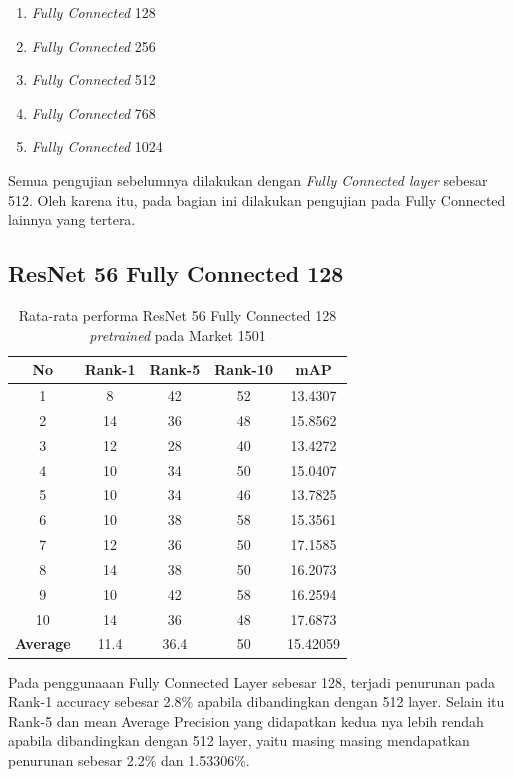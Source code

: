 \begin{enumerate}[nolistsep]
	\item \textit{Fully Connected} 128
	\item \textit{Fully Connected} 256
	\item \textit{Fully Connected} 512
	\item \textit{Fully Connected} 768
	\item \textit{Fully Connected} 1024
	\vspace{1ex}
\end{enumerate}

Semua pengujian sebelumnya dilakukan dengan \textit{Fully Connected layer} sebesar 512. Oleh karena itu, pada bagian ini dilakukan pengujian pada Fully Connected lainnya yang tertera.

\pagebreak

\subsection{ResNet 56 Fully Connected 128}
\vspace{1ex}
\begin{longtable}{|c|c|c|c|c|}
	\caption{Rata-rata performa ResNet 56 Fully Connected 128 \textit{pretrained} pada Market 1501}
	\label{tabel: 10}\\
	\hline
	\rowcolor[HTML]{C0C0C0}
	\textbf{No} &\textbf{Rank-1} & \textbf{Rank-5} & \textbf{Rank-10} & \textbf{mAP} \\
	\hline
	1 &8 &42 &52 &13.4307 \\
	2 &14 &36 &48 &15.8562 \\
	3 &12 &28 &40 &13.4272 \\
	4 &10 &34 &50 &15.0407 \\
	5 &10 &34 &46 &13.7825 \\
	6 &10 &38 &58 &15.3561 \\
	7 &12 &36 &50 &17.1585 \\
	8 &14 &38 &50 &16.2073 \\
	9 &10 &42 &58 &16.2594 \\
	10 &14 &36 &48 &17.6873 \\
	\hline
	\textbf{Average} & 11.4 & 36.4 & 50 &15.42059 \\
	\hline
\end{longtable}
\vspace{2ex}
	Pada penggunaaan Fully Connected Layer sebesar 128, terjadi penurunan pada Rank-1 accuracy sebesar 2.8\% apabila dibandingkan dengan 512 layer. Selain itu Rank-5 dan mean Average Precision yang didapatkan kedua nya lebih rendah apabila dibandingkan dengan 512 layer, yaitu masing masing mendapatkan penurunan sebesar 2.2\% dan 1.53306\%.
\vspace{2ex}
